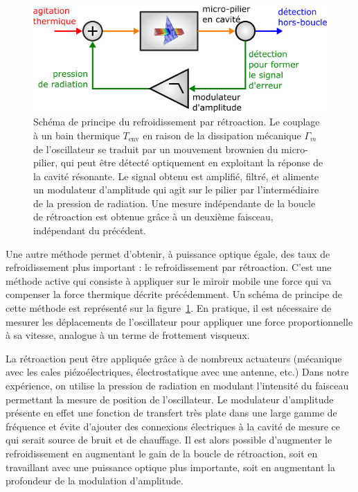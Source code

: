 \documentclass[12pt,a4paper]{article}
\begin{document}
\begin{figure}
\center
\includegraphics[scale=0.5]{figures/feedback_cooling.png}
\caption{Schéma de principe du refroidissement par rétroaction.
Le couplage à un bain thermique $T_\mathrm{env}$ en raison de la dissipation mécanique $\Gamma_m$ de l'oscillateur se traduit par un mouvement brownien du micro-pilier, qui peut être détecté optiquement en exploitant la réponse de la cavité résonante.
Le signal obtenu est amplifié, filtré, et alimente un modulateur d'amplitude qui agit sur le pilier par l'intermédiaire de la pression de radiation.
Une mesure indépendante de la boucle de rétroaction est obtenue grâce à un deuxième faisceau, indépendant du précédent.}
\label{fig:feedback_scheme}
\end{figure}

Une autre méthode permet d'obtenir, à puissance optique égale, des taux de refroidissement plus important : le refroidissement par rétroaction.
C'est une méthode active qui consiste à appliquer sur le miroir mobile une force qui va compenser la force thermique décrite précédemment.
Un schéma de principe de cette méthode est représenté sur la figure~\ref{fig:feedback_scheme}.
En pratique, il est nécessaire de mesurer les déplacements de l'oscillateur pour appliquer une force proportionnelle à sa vitesse, analogue à un terme de frottement visqueux.

La rétroaction peut être appliquée grâce à de nombreux actuateurs (mécanique avec les cales piézoélectriques, électrostatique avec une antenne, etc.)
Dans notre expérience, on utilise la pression de radiation en modulant l'intensité du faisceau permettant la mesure de position de l'oscillateur.
Le modulateur d'amplitude présente en effet une fonction de transfert très plate dans une large gamme de fréquence et évite d'ajouter des connexions électriques à la cavité de mesure ce qui serait source de bruit et de chauffage.
Il est alors possible d'augmenter le refroidissement en augmentant le gain de la boucle de rétroaction, soit en travaillant avec une puissance optique plus importante, soit en augmentant la profondeur de la modulation d'amplitude.
\end{document}
